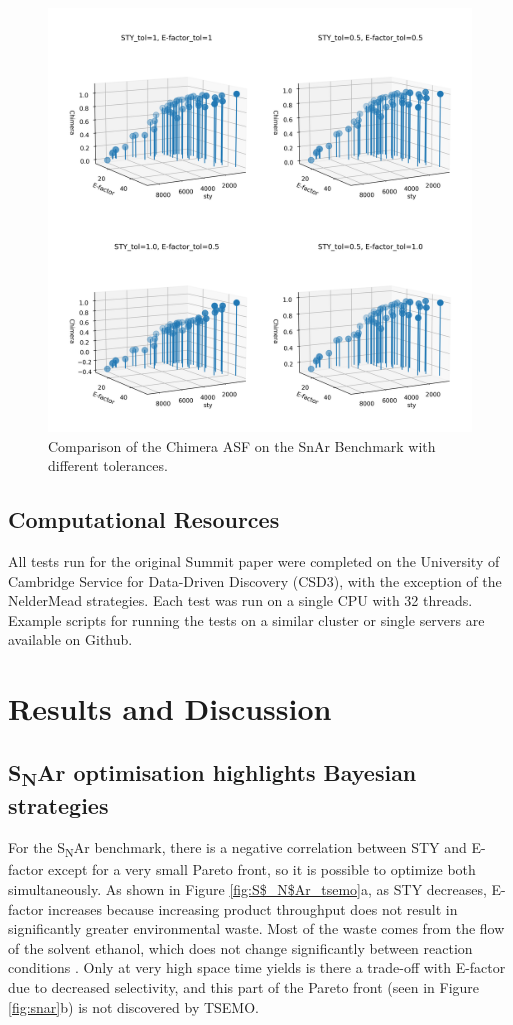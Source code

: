 \begin{figure}
    \includegraphics[width=\textwidth]{gfx/Chapter03/chimera_comparison.png}
    \caption{Comparison of the Chimera ASF on the SnAr Benchmark with different tolerances.}
    \label{fig:chimera_comparsion}
\end{figure}

\subsection{Computational Resources}
All tests run for the original Summit paper were completed on the University of Cambridge Service for Data-Driven Discovery (CSD3), with the exception of the NelderMead strategies. Each test was run on a single CPU with 32 threads. Example scripts for running the tests on a similar cluster or single servers are available on Github. 


\section{Results and Discussion}

\subsection{S\textsubscript{N}Ar optimisation highlights Bayesian strategies}
For the S\textsubscript{N}Ar benchmark, there is a negative correlation between STY and E-factor except for a very small Pareto front, so it is possible to optimize both simultaneously. As shown in Figure \ref{fig:S$_N$Ar_tsemo}a, as STY decreases, E-factor increases because increasing product throughput does not result in significantly greater environmental waste. Most of the waste comes from the flow of the solvent ethanol, which does not change significantly between reaction conditions \cite{Jeraal2020}. Only at very high space time yields is there a trade-off with E-factor due to decreased selectivity, and this part of the Pareto front (seen in Figure \ref{fig:snar}b) is not discovered by TSEMO.

